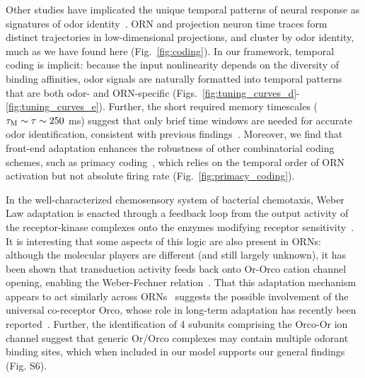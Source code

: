\documentclass[9pt,twocolumn,twoside]{pnas-new}
\begin{document}
Other studies have implicated the unique temporal patterns of neural response as signatures of odor identity~\cite{stopfer_temporal_model, multiple_timescales_stopfer, stopfer_nat_neuro, stopfer_temporal_channel}. ORN and projection neuron time traces form distinct trajectories in low-dimensional projections, and cluster by odor identity, much as we have found here (Fig.~\ref{fig:coding}). In our framework, temporal coding is implicit: because the input nonlinearity depends on the diversity of binding affinities, %
odor signals are naturally formatted into temporal patterns that are both odor- and ORN-specific  (Figs.~\ref{fig:tuning_curves_d}-\ref{fig:tuning_curves_e}). Further, the short required memory timescales  ($\tau_{\textup M} \sim \tau \sim 250$ ms) suggest that only brief time windows are needed for accurate odor identification, consistent with previous findings~\cite{stopfer_nat_neuro}. Moreover, we find that front-end adaptation enhances the robustness of other combinatorial coding schemes, such as primacy coding~\cite{primacy_coding}, which relies on the temporal order of ORN activation but not absolute firing rate (Fig.~\ref{fig:primacy_coding}).

In the well-characterized chemosensory system of bacterial chemotaxis, Weber Law adaptation is enacted through a feedback loop from the output activity of the receptor-kinase complexes onto the enzymes modifying receptor sensitivity~\cite{EmonetReview}. It is interesting that some aspects of this logic are also present in ORNs: although the molecular players are different (and still largely unknown), it has been shown that transduction activity feeds back onto Or-Orco cation channel opening, enabling the Weber-Fechner relation~\cite{nagel_wilson_biophysical,srinivas_elife,cao_WL}. 
That this adaptation mechanism appears to act similarly across ORNs~\cite{srinivas_elife,martelli,cao_WL} suggests the possible involvement of the universal co-receptor Orco, whose role in long-term adaptation has recently been reported~\cite{getahun2013insect,getahun2016intracellular,Guo_Smith}. Further, the identification of 4 subunits comprising the Orco-Or ion channel suggest that generic Or/Orco complexes may contain multiple odorant binding sites, which when included in our model supports our general findings (Fig. S6).
\end{document}
